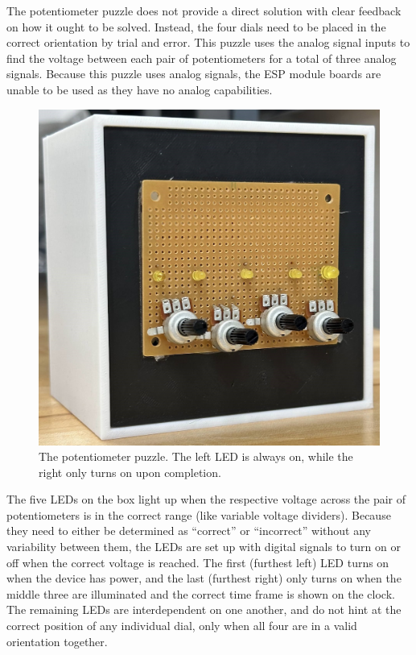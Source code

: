 \documentclass[conference]{IEEEtran}
\begin{document}
The potentiometer puzzle does not provide a direct solution with clear feedback on how it ought to be solved. Instead, 
the four dials need to be placed in the correct orientation by trial and error. This puzzle uses the analog signal inputs 
to find the voltage between each pair of potentiometers for a total of three analog signals. Because this puzzle uses analog 
signals, the ESP module boards are unable to be used as they have no analog capabilities.

\begin{figure}[ht]
    \centering
    \includegraphics[width=0.90\columnwidth]{Images/pot_puzzle.jpg}
    \caption{The potentiometer puzzle. The left LED is always on, while the right only turns on upon completion.}
\end{figure}

\indent The five LEDs on the box light up when the respective voltage across the pair of potentiometers is in the 
correct range (like variable voltage dividers). Because they need to either be determined as ``correct'' or ``incorrect'' 
without any variability between them, the LEDs are set up with digital signals to turn on or off when the correct voltage is 
reached. The first (furthest left) LED turns on when the device has power, and the last (furthest right) only turns on when 
the middle three are illuminated and the correct time frame is shown on the clock. The remaining LEDs are interdependent on one 
another, and do not hint at the correct position of any individual dial, only when all four are in a valid orientation together.
\end{document}
